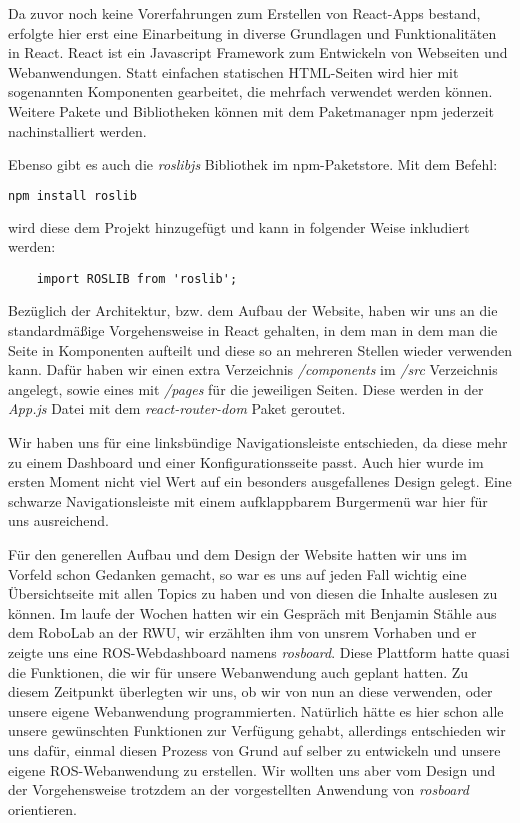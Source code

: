 \begin{flushleft}

Da zuvor noch keine Vorerfahrungen zum Erstellen von React-Apps bestand, erfolgte hier erst eine Einarbeitung in diverse Grundlagen und Funktionalitäten in  React. React ist ein Javascript Framework zum Entwickeln von Webseiten und Webanwendungen. Statt einfachen statischen HTML-Seiten wird hier mit sogenannten Komponenten gearbeitet, die mehrfach verwendet werden können. Weitere Pakete und Bibliotheken können mit dem Paketmanager npm jederzeit nachinstalliert werden.

Ebenso gibt es auch die \textit{roslibjs} Bibliothek im npm-Paketstore. Mit dem Befehl:
\begin{lstlisting}[language=bash]
    npm install roslib 
\end{lstlisting}

wird diese dem Projekt hinzugefügt und kann in folgender Weise inkludiert werden:

\begin{lstlisting}
    import ROSLIB from 'roslib';
\end{lstlisting}

Bezüglich der Architektur, bzw. dem Aufbau der Website, haben wir uns an die standardmäßige Vorgehensweise in React gehalten, in dem man in dem man die Seite in Komponenten aufteilt und diese so an mehreren Stellen wieder verwenden kann. Dafür haben wir einen extra Verzeichnis \textit{/components} im \textit{/src} Verzeichnis angelegt, sowie eines mit \textit{/pages} für die jeweiligen Seiten. Diese werden in der \textit{App.js} Datei mit dem \textit{react-router-dom} Paket geroutet.


Wir haben uns für eine linksbündige Navigationsleiste entschieden, da diese mehr zu einem Dashboard und einer Konfigurationsseite passt. Auch hier wurde im ersten Moment nicht viel Wert auf ein besonders ausgefallenes Design gelegt. Eine schwarze Navigationsleiste mit einem aufklappbarem Burgermenü war hier für uns ausreichend. 

Für den generellen Aufbau und dem Design der Website hatten wir uns im Vorfeld schon Gedanken gemacht, so war es uns auf jeden Fall wichtig eine Übersichtseite mit allen Topics zu haben und von diesen die Inhalte auslesen zu können. Im laufe der Wochen hatten wir ein Gespräch mit Benjamin Stähle aus dem RoboLab an der RWU, wir erzählten ihm von unsrem Vorhaben und er zeigte uns eine ROS-Webdashboard namens \textit{rosboard}. Diese Plattform hatte quasi die Funktionen, die wir für unsere Webanwendung auch geplant hatten. Zu diesem Zeitpunkt überlegten wir uns, ob wir von nun an diese verwenden, oder unsere eigene Webanwendung programmierten. Natürlich hätte es hier schon alle unsere gewünschten Funktionen zur Verfügung gehabt, allerdings entschieden wir uns dafür, einmal diesen Prozess von Grund auf selber zu entwickeln und unsere eigene ROS-Webanwendung zu erstellen. Wir wollten uns aber vom Design und der Vorgehensweise trotzdem an der vorgestellten Anwendung von \textit{rosboard} orientieren.

\end{flushleft}